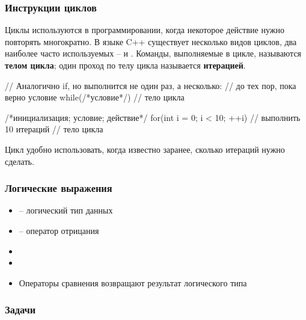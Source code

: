 \begin{frame}[fragile]
	\frametitle{Инструкции циклов}
	Циклы используются в программировании, когда некоторое действие
	нужно повторять многократно. В языке C++ существует несколько видов циклов,
	два наиболее часто используемых --  и . Команды,
	выполняемые в цикле, называются {\bf телом цикла}; один проход по телу цикла
	называется {\bf итерацией}.
	\begin{code}
// Аналогично if, но выполнится не один раз, а несколько:
// до тех пор, пока верно условие
while(/*условие*/)
{
	// тело цикла
}

/*инициализация; условие; действие*/
for(int i = 0; i < 10; ++i) // выполнить 10 итераций
{
	// тело цикла
}
	\end{code}
	Цикл  удобно использовать, когда известно заранее, сколько итераций
	нужно сделать. \newline

\end{frame}

\begin{frame}
	\frametitle{Логические выражения}
	\begin{itemize}
		\item {} -- логический тип данных
		\item \lcode{!} -- оператор отрицания
		\item {}
		\item {}
		\item Операторы сравнения возвращают результат логического типа
	\end{itemize}
\end{frame}

\begin{frame}
	\frametitle{Задачи}
\end{frame}

